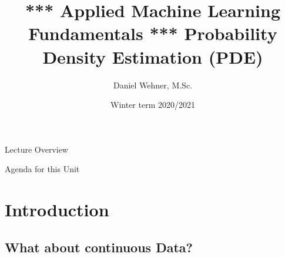 


\title[Probability Density Estimation]{*** Applied Machine Learning Fundamentals *** Probability Density Estimation (PDE)}
\author{Daniel Wehner, M.Sc.}
\date{Winter term 2020/2021}




\maketitlepage


\begin{frame}{Lecture Overview}{}
\end{frame}


\begin{frame}{Agenda for this Unit}
	\begin{multicols}{2}
		\tableofcontents
	\end{multicols}
\end{frame}


\section{Introduction}

\subsection{What about continuous Data?}

